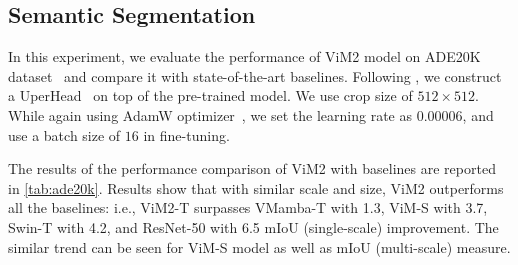 \documentclass{article}
\newcommand{\head}[1]{\vspace{1.7mm}\noindent{{\textcolor{c1}{\bf #1.}}}}
\begin{document}
\subsection{Semantic Segmentation}
\head{Setup}
In this experiment, we evaluate the performance of ViM2 model on ADE20K dataset~\citep{zhou2019semantic} and compare it with state-of-the-art baselines. Following \citet{liu2024vmamba}, we construct a UperHead~\citep{xiao2018unified} on top of the pre-trained model. We use crop size of $512 \times 512$. While again using AdamW optimizer~\citep{loshchilov2018decoupled}, we set the learning rate as $0.00006$, and use a batch size of $16$ in fine-tuning. 







\head{Results}
The results of the performance comparison of ViM2 with baselines are reported in \autoref{tab:ade20k}. Results show that with similar scale and size, ViM2 outperforms all the baselines: i.e., ViM2-T surpasses VMamba-T with 1.3, ViM-S with 3.7, Swin-T with 4.2, and ResNet-50 with 6.5 mIoU (single-scale) improvement. The similar trend can be seen for ViM-S model as well as mIoU (multi-scale) measure. 
\end{document}
